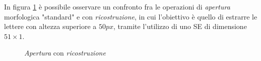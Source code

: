 In figura \ref{fig:opening-reconstruction} \`e possibile osservare un confronto fra le operazioni di \textit{apertura} morfologica "standard" e con \textit{ricostruzione}, in cui l'obiettivo \`e quello di estrarre le lettere con altezza superiore a $50px$, tramite l'utilizzo di uno SE di dimensione $51\times1$.
\begin{figure}[H]
	\centering
	\caption[\textit{Apertura} con \textit{ricostruzione}]{\textit{Apertura} con \textit{ricostruzione}\protect\footnotemark} \label{fig:opening-reconstruction}
\end{figure}

